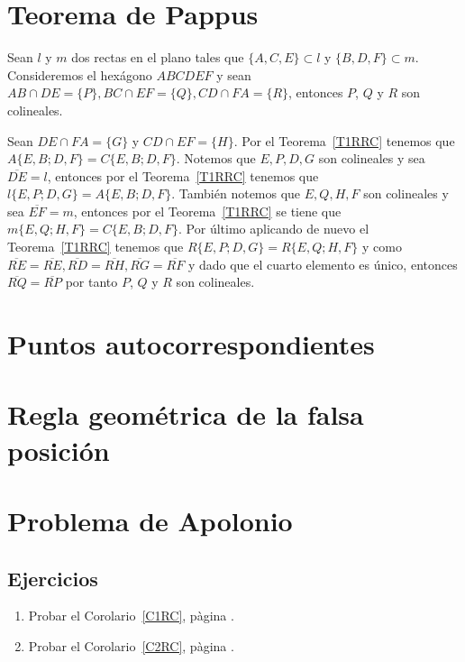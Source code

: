 \section{Teorema de Pappus}
\begin{teo}
Sean $l$ y $m$ dos rectas en el plano tales que $\{A,C,E\}\subset l$ y $\{B,D,F\}\subset m$. Consideremos el hexágono $ABCDEF$ y sean $AB\cap DE=\{P\}, BC\cap EF=\{Q\}, CD\cap FA=\{R\}$, entonces $P$, $Q$ y $R$ son colineales. 
\end{teo}
\begin{dem}
Sean $DE\cap FA=\{G\}$ y $CD\cap EF=\{H\}$. Por el Teorema~\ref{T1RRC} tenemos que $A\{E,B;D,F\}=C\{E,B;D,F\}$. Notemos que $E,P,D,G$ son colineales y sea $\overline{DE}=l$, entonces por el Teorema~\ref{T1RRC} tenemos que $l\{E,P;D,G\}=A\{E,B;D,F\}$. También notemos que $E,Q,H,F$ son colineales y sea $\overline{EF}=m$, entonces por el Teorema~\ref{T1RRC} se tiene que $m\{E,Q;H,F\}=C\{E,B;D,F\}$. Por último aplicando de nuevo el Teorema~\ref{T1RRC} tenemos que $R\{E,P;D,G\}=R\{E,Q;H,F\}$ y como $\overline{RE}=\overline{RE}, \overline{RD}=\overline{RH}, \overline{RG}=\overline{RF}$ y dado que el cuarto elemento es único, entonces $\overline{RQ}=\overline{RP}$ por tanto $P$, $Q$ y $R$ son colineales. 

\end{dem}
\section{Puntos autocorrespondientes}

\section{Regla geométrica de la falsa posición}

\section{Problema de Apolonio}


\subsection*{Ejercicios}
\begin{enumerate}
\item Probar el Corolario~\ref{C1RC}, pàgina \pageref{C1RC}. \label{E1RC}
\item Probar el Corolario~\ref{C2RC}, pàgina \pageref{C2RC}. \label{E2RC}

\end{enumerate}


